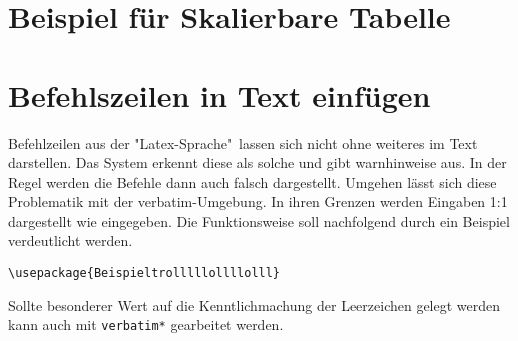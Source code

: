 \section*{Beispiel für Skalierbare Tabelle}
\vspace*{-2.5mm}
\renewcommand{\arraystretch}{1.2}
\begin{table}[h!]
	\centering
	\caption*{}
\end{table}
\FloatBarrier

\section{Befehlszeilen in Text einfügen}
Befehlzeilen aus der "Latex-Sprache"\ lassen sich nicht ohne weiteres im Text darstellen. Das System erkennt diese als solche und gibt warnhinweise aus. In der Regel werden die Befehle dann auch falsch dargestellt. Umgehen lässt sich diese Problematik mit der verbatim-Umgebung. In ihren Grenzen werden Eingaben 1:1 dargestellt wie eingegeben. Die Funktionsweise soll nachfolgend durch ein Beispiel verdeutlicht werden.
\begin{verbatim*}

\begin{verbatim}
\usepackage{Beispieltrolllllollllolll} 
\end{verbatim}

\end{verbatim*}

Sollte besonderer Wert auf die Kenntlichmachung der Leerzeichen gelegt werden kann auch mit \texttt{verbatim*} gearbeitet werden.

